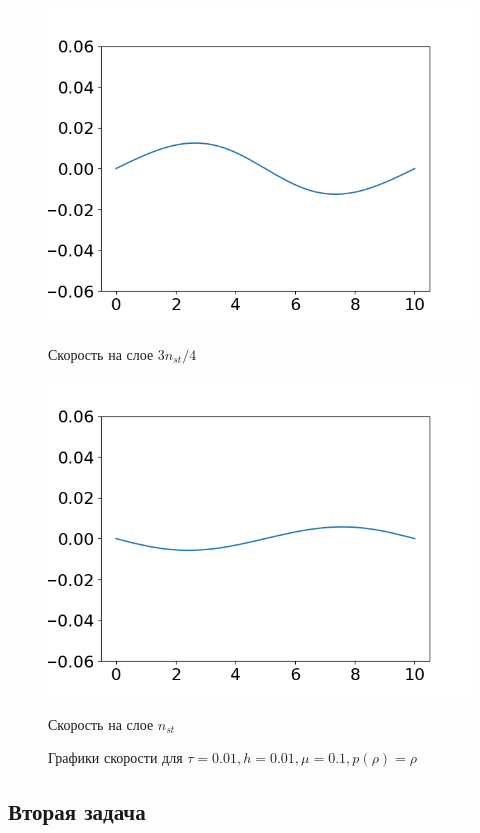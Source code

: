 \begin{figure}[h]
\begin{minipage}[h]{0.47\linewidth}
		\includegraphics[width=1\linewidth]{pics/task2/34u_1.png} 
		\caption{Скорость на слое $3n_{st} / 4$}
	\end{minipage}
	\hfill
	\begin{minipage}[h]{0.47\linewidth}
		\centering
		\includegraphics[width=1\linewidth]{pics/task2/44u_1.png} 
		\caption{Скорость на слое $n_{st}$}
	\end{minipage}
	\caption{Графики скорости для $\tau = 0.01, h = 0.01, \mu = 0.1, p(\rho) = \rho$}
\end{figure}

\subsection{Вторая задача}
